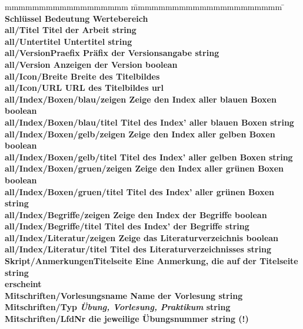 			\begin{tabbing}
				mmmmmmmmmmmmmmmmmm				\= mmmmmmmmmmmmmmmmmmmmmm 				\=\kill
				\bf Schlüssel					\> \bf Bedeutung 						\> \bf Wertebereich	\\
				all/Titel	 					\> Titel der Arbeit						\> string			\\
				all/Untertitel 					\> Untertitel							\> string			\\
				all/VersionPraefix 				\> Präfix der Versionsangabe			\> string			\\
				all/Version 					\> Anzeigen der Version					\> boolean 			\\
				all/Icon/Breite					\> Breite des Titelbildes				\> \doubleplus 		\\
				all/Icon/URL					\> URL des Titelbildes					\> url				\\
				all/Index/Boxen/blau/zeigen 	\> Zeige den Index aller blauen Boxen	\> boolean 			\\
				all/Index/Boxen/blau/titel 		\> Titel des Index' aller blauen Boxen	\> string			\\
				all/Index/Boxen/gelb/zeigen 	\> Zeige den Index aller gelben Boxen	\> boolean 			\\
				all/Index/Boxen/gelb/titel 		\> Titel des Index' aller gelben Boxen	\> string			\\
				all/Index/Boxen/gruen/zeigen 	\> Zeige den Index aller grünen Boxen	\> boolean 			\\
				all/Index/Boxen/gruen/titel 	\> Titel des Index' aller grünen Boxen	\> string			\\
				all/Index/Begriffe/zeigen 		\> Zeige den Index der Begriffe			\> boolean			\\
				all/Index/Begriffe/titel 		\> Titel des Index' der Begriffe		\> string			\\
				all/Index/Literatur/zeigen		\> Zeige das Literaturverzeichnis		\> boolean			\\
				all/Index/Literatur/titel		\> Titel des Literaturverzeichnisses	\> string			\\
				Skript/AnmerkungenTitelseite 	\> Eine Anmerkung, die auf der Titelseite\> string			\\ 
												\> erscheint												\\
				Mitschriften/Vorlesungsname 	\> Name der Vorlesung 					\> string			\\
				Mitschriften/Typ 				\> \zb \emph{Übung, Vorlesung, Praktikum}	
																						\> string			\\
				Mitschriften/LfdNr 				\> \zb die jeweilige Übungsnummer		\> string (!)		\\

\end{tabbing}
